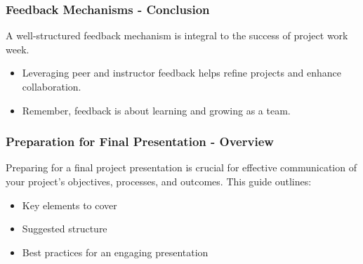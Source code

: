 \documentclass{beamer}
\begin{document}
\begin{frame}[fragile]
    \frametitle{Feedback Mechanisms - Conclusion}
    A well-structured feedback mechanism is integral to the success of project work week. 
    \begin{itemize}
        \item Leveraging peer and instructor feedback helps refine projects and enhance collaboration.
        \item Remember, feedback is about learning and growing as a team.
    \end{itemize}
\end{frame}

\begin{frame}[fragile]
    \frametitle{Preparation for Final Presentation - Overview}
    Preparing for a final project presentation is crucial for effective communication of your project's objectives, processes, and outcomes. 
    This guide outlines:
    \begin{itemize}
        \item Key elements to cover
        \item Suggested structure
        \item Best practices for an engaging presentation
    \end{itemize}
\end{frame}
\end{document}

